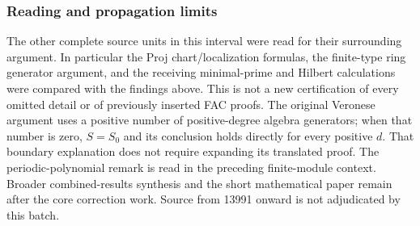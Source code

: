 \subsubsection{Reading and propagation limits}\label{algebra-proof-002-reading-and-propagation-limits}

The other complete source units in this interval were read for their surrounding argument. In particular the Proj chart/localization formulas, the finite-type ring generator argument, and the receiving minimal-prime and Hilbert calculations were compared with the findings above. This is not a new certification of every omitted detail or of previously inserted FAC proofs. The original Veronese argument uses a positive number of positive-degree algebra generators; when that number is zero, \(S=S_0\) and its conclusion holds directly for every positive \(d\). That boundary explanation does not require expanding its translated proof. The periodic-polynomial remark is read in the preceding finite-module context. Broader combined-results synthesis and the short mathematical paper remain after the core correction work. Source from 13991 onward is not adjudicated by this batch.
